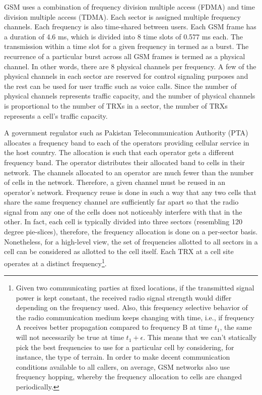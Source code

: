 GSM uses a combination of frequency division multiple access (FDMA) and time division multiple access (TDMA). Each sector is assigned multiple frequency channels. Each frequency is also time-shared between users. Each GSM frame has a duration of 4.6 ms, which is divided into 8 time slots of 0.577 ms each. The transmission within a time slot for a given frequency in termed as a burst. The recurrence of a particular burst across all GSM frames is termed as a physical channel. In other words, there are 8 physical channels per frequency. A few of the physical channels in each sector are reserved for control signaling purposes and the rest can be used for user traffic such as voice calls. Since the number of physical channels represents traffic capacity, and the number of physical channels is proportional to the number of TRXs in a sector, the number of TRXs represents a cell's traffic capacity.

A government regulator such as Pakistan Telecommunication Authority (PTA) allocates a frequency band to each of the operators providing cellular service in the host country. The allocation is such that each operator gets a different frequency band. The operator distributes their allocated band to cells in their network. The channels allocated to an operator are much fewer than the number of cells in the network. Therefore, a given channel must be reused in an operator's network. Frequency reuse is done in such a way that any two cells that share the same frequency channel are sufficiently far apart so that the radio signal from any one of the cells does not noticeably interfere with that in the other. In fact, each cell is typically divided into three sectors (resembling 120 degree pie-slices), therefore, the frequency allocation is done on a per-sector basis. Nonetheless, for a high-level view, the set of frequencies allotted to all sectors in a cell can be considered as allotted to the cell itself. Each TRX at a cell site operates at a distinct frequency\footnote{Given two communicating parties at fixed locations, if the transmitted signal power is kept constant, the received radio signal strength would differ depending on the frequency used. Also, this frequency selective behavior of the radio communication medium keeps changing with time, i.e., if frequency A receives better propagation compared to frequency B at time $t_1$, the same will not necessarily be true at time $t_1+\epsilon$. This means that we can't statically pick the best frequencies to use for a particular cell by considering, for instance, the type of terrain. In order to make decent communication conditions available to all callers, on average, GSM networks also use frequency hopping, whereby the frequency allocation to cells are changed periodically.}. 

